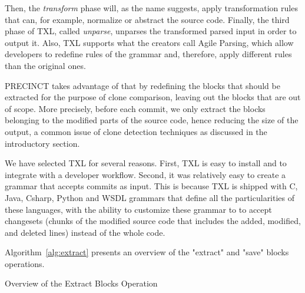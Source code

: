 \documentclass[conference]{IEEEtran}
\begin{document}
Then, the \textit{transform} phase will, as the name suggests, apply transformation rules that can, for example, normalize or abstract the source code. Finally, the third phase of TXL,  called \textit{unparse}, unparses the transformed parsed input in order to output it.
Also, TXL supports what the creators call Agile Parsing\cite{Dean}, which allow developers to redefine rules of the grammar and, therefore, apply different rules than the original ones.


PRECINCT takes advantage of that by redefining the blocks that should be extracted for the purpose of clone comparison, leaving out the  blocks that are out of scope.
More precisely, before each commit, we only extract the blocks belonging to the modified parts of the source code, hence reducing the size of the output, a common issue of clone detection techniques as discussed in the introductory section.

We have selected TXL for several reasons. First, TXL is easy to install and to integrate with a developer workflow.
 Second, it was relatively easy to create a grammar that accepts commits as input.
 This is because TXL is shipped with C, Java, Csharp, Python and WSDL grammars that define all the particularities of these languages, with the ability to customize these grammar to to accept changesets (chunks of the modified source code that includes the added, modified, and deleted lines) instead of the whole code.


Algorithm~\ref{alg:extract} presents an overview of the "extract" and "save" blocks operations.

\begin{algorithm}[H]


 \caption{Overview of the Extract Blocks Operation\label{alg:extract}}
\end{algorithm}
\end{document}
